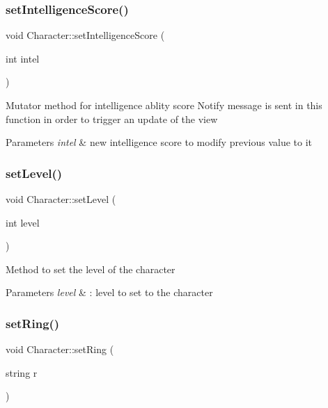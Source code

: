 \subsubsection{\texorpdfstring{set\+Intelligence\+Score()}{setIntelligenceScore()}}
{\footnotesize\ttfamily void Character\+::set\+Intelligence\+Score (\begin{DoxyParamCaption}\item[{int}]{intel }\end{DoxyParamCaption})}

Mutator method for intelligence ablity score Notify message is sent in this function in order to trigger an update of the view 
\begin{DoxyParams}{Parameters}
{\em intel} & new intelligence score to modify previous value to it \\
\hline
\end{DoxyParams}
\hypertarget{class_character_a470a76c1062d97e40ce97997a4fdc62a}{}\label{class_character_a470a76c1062d97e40ce97997a4fdc62a} 
\subsubsection{\texorpdfstring{set\+Level()}{setLevel()}}
{\footnotesize\ttfamily void Character\+::set\+Level (\begin{DoxyParamCaption}\item[{int}]{level }\end{DoxyParamCaption})}

Method to set the level of the character 
\begin{DoxyParams}{Parameters}
{\em level} & \+: level to set to the character \\
\hline
\end{DoxyParams}
\hypertarget{class_character_a68653da50efcfeefca60d163bc30b419}{}\label{class_character_a68653da50efcfeefca60d163bc30b419} 
\subsubsection{\texorpdfstring{set\+Ring()}{setRing()}}
{\footnotesize\ttfamily void Character\+::set\+Ring (\begin{DoxyParamCaption}\item[{string}]{r }\end{DoxyParamCaption})}


